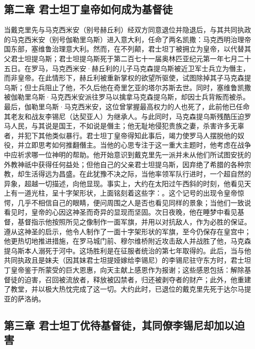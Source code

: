 \subsection{第二章 君士坦丁皇帝如何成为基督徒}

当戴克里先与马克西米安（别号赫丘利）经双方同意退位并隐退后，与其共同执政的马克西米安（别号伽勒里乌斯）进入意大利，任命了两名凯撒：马克西明治理帝国东部，塞维鲁治理意大利。然而，在不列颠，君士坦丁被拥立为皇帝，以代替其父君士坦提乌斯；君士坦提乌斯死于第二百七十一届奥林匹亚纪元第一年七月二十五日。在罗马，马克西米安·赫丘利的儿子马克森提乌斯被近卫军士兵立为僭主，而非皇帝。在此情形下，赫丘利被重新掌权的欲望所驱使，试图除掉其子马克森提乌斯；但士兵阻止了他，不久后他在奇里乞亚的塔尔苏斯去世。同时，塞维鲁凯撒被伽勒里乌斯·马克西米安派往罗马以擒拿马克森提乌斯，却因士兵背叛而被杀。最后，伽勒里乌斯·马克西米安，这位曾掌握最高权力的人也死了，此前他已任命其老友和战友李锡尼（达契亚人）为继承人。与此同时，马克森提乌斯残酷压迫罗马人民，与其说是国王，不如说是僭主；他无耻地侵犯贵族之妻，杀害许多无辜者，并犯下其他类似暴行。君士坦丁皇帝得知此事后，竭力使罗马人摆脱他的奴役，并立即思考如何推翻僭主。当他的心思专注于这一重大主题时，他考虑在战争中应祈求哪一位神明的帮助。他开始意识到戴克里先一派并未从他们所试图安抚的外教神祇中获得任何益处；但他自己的父亲君士坦提乌斯，因弃绝了希腊的各种宗教，却生活得远为昌盛。在此犹豫不决之际，当他率领军队行进时，一个超自然的异象，超越一切描述，向他显现。事实上，大约在太阳过午西斜的时刻，他看见天上有一道光柱，呈十字架形状，上面铭刻着这些字：。这个记号的出现令皇帝惊愕，几乎不相信自己的眼睛，便问周围之人是否也看见同样的景象；当他们一致说看见时，皇帝的心因这神圣而奇异的显现而坚固。次日夜晚，他在睡梦中看见基督，基督指示他按照所见之像制作一面军旗，并用以对抗敌人，作为必胜的保证。遵从这神圣的启示，他令人制作了一面十字架形状的军旗，至今仍保存在皇宫中；他更热切地推进措施，在罗马城门前、穆尔维桥附近攻击敌人并战胜了他，马克森提乌斯本人溺死于河中。这场胜利是在征服者统治的第七年取得的。此后，当与他共同执政且是妹夫（因其妹君士坦提娅嫁给李锡尼）的李锡尼驻守东方时，君士坦丁皇帝鉴于所蒙受的巨大恩惠，向天主献上感恩作为报谢；这些感恩包括：解除基督徒的迫害，召回被流放者，释放被囚禁者，归还被剥夺者的财产；此外，他重建了教堂，并以极大热忱完成了这一切。大约此时，已退位的戴克里先死于达尔马提亚的萨洛纳。\par


\subsection{第三章 君士坦丁优待基督徒，其同僚李锡尼却加以迫害}

